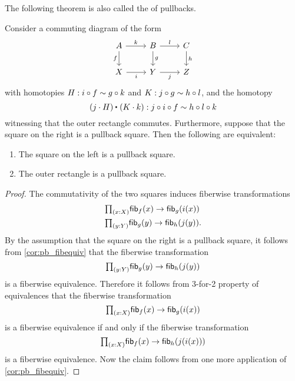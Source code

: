 The following theorem is also called the  of pullbacks.

\begin{prp}\label{thm:pb_pasting}
Consider a commuting diagram of the form
\begin{equation*}
\begin{tikzcd}
A \arrow[r,"k"] \arrow[d,swap,"f"] & B \arrow[r,"l"] \arrow[d,"g"] & C \arrow[d,"h"] \\
X \arrow[r,swap,"i"] & Y \arrow[r,swap,"j"] & Z
\end{tikzcd}
\end{equation*}
with homotopies $H:i\circ f\sim g\circ k$ and $K:j\circ g\sim h\circ l$, and the homotopy
\begin{equation*}
\ct{(j\cdot H)}{(K\cdot k)}:j\circ i\circ f\htpy h\circ l\circ k
\end{equation*}
witnessing that the outer rectangle commutes. Furthermore, suppose that the square on the right is a pullback square. Then the following are equivalent:
\begin{samepage}%
\begin{enumerate}
\item The square on the left is a pullback square.
\item The outer rectangle is a pullback square.
\end{enumerate}%
\end{samepage}%
\end{prp}

\begin{proof}
The commutativity of the two squares induces fiberwise transformations
\begin{align*}
& \prd{x:X}\fib{f}{x}\to \fib{g}{i(x)} \\
& \prd{y:Y}\fib{g}{y}\to \fib{h}{j(y)}.
\end{align*}
By the assumption that the square on the right is a pullback square, it follows from \cref{cor:pb_fibequiv} that the fiberwise transformation
\begin{equation*}
\prd{y:Y}\fib{g}{y}\to\fib{h}{j(y)}
\end{equation*}
is a fiberwise equivalence. Therefore it follows from 3-for-2 property of equivalences that the fiberwise transformation
\begin{equation*}
\prd{x:X}\fib{f}{x}\to\fib{g}{i(x)}
\end{equation*}
is a fiberwise equivalence if and only if the fiberwise transformation
\begin{equation*}
\prd{x:X}\fib{f}{x}\to\fib{h}{j(i(x))}
\end{equation*}
is a fiberwise equivalence. Now the claim follows from one more application of \cref{cor:pb_fibequiv}.
\end{proof}

